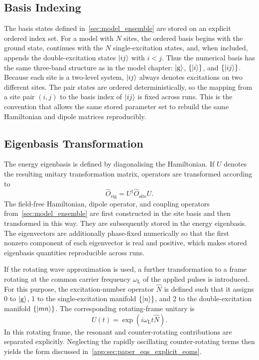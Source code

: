 \subsection{Basis Indexing}

The basis states defined in~\autoref{sec:model_ensemble} are stored on an
explicit ordered index set. For a model with \(N\) sites, the
ordered basis begins with the ground state, continues with the
\(N\) single-excitation states, and, when included, appends
the double-excitation states \(\ket{ij}\) with \(i<j\). Thus the numerical
basis has the same three-band structure as in the model chapter:
\(\ket{\mathrm{g}}\), \(\{\ket{i}\}\), and \(\{\ket{ij}\}\). Because each site is a
two-level system, \(\ket{ij}\) always denotes excitations on two different
sites. The pair states are ordered deterministically, so the mapping from a
site pair \((i,j)\) to the basis index of \(\ket{ij}\) is fixed across runs.
This is the convention that allows the same stored parameter set to rebuild the
same Hamiltonian and dipole matrices reproducibly.

\subsection{Eigenbasis Transformation}

The energy eigenbasis is defined by diagonalising the Hamiltonian. If \(U\)
denotes the resulting unitary transformation matrix, operators are transformed
according to
\begin{equation*}
\hat{O}_{\mathrm{eig}} = U^{\dagger}\hat{O}_{\mathrm{site}}U.
\end{equation*}
The field-free Hamiltonian, dipole operator, and coupling operators
from~\autoref{sec:model_ensemble} are first constructed in the site basis and
then transformed in this way. They are subsequently stored in the energy
eigenbasis. The eigenvectors are additionally phase-fixed numerically so that
the first nonzero component of each eigenvector is real and positive, which
makes stored eigenbasis quantities reproducible across runs.

If the rotating wave approximation is used, a further transformation to a frame rotating at the
common carrier frequency \(\omega_{\mathrm{L}}\) of the applied pulses is introduced. For
this purpose, the excitation-number operator \(\hat{N}\) is defined such that
it assigns 0 to \(\ket{\mathrm{g}}\), 1 to the single-excitation manifold
\(\{\ket{n}\}\), and 2 to the double-excitation manifold \(\{\ket{mn}\}\). The
corresponding rotating-frame unitary is
\begin{equation*}
    U(t)=\exp\!\left(i\omega_{\mathrm{L}} t \hat{N}\right).
\end{equation*}
In this rotating frame, the resonant and counter-rotating contributions are
separated explicitly. Neglecting the rapidly oscillating counter-rotating terms
then yields the form discussed
in~\autoref{app:sec:paper_eqs_explicit_eoms}.

